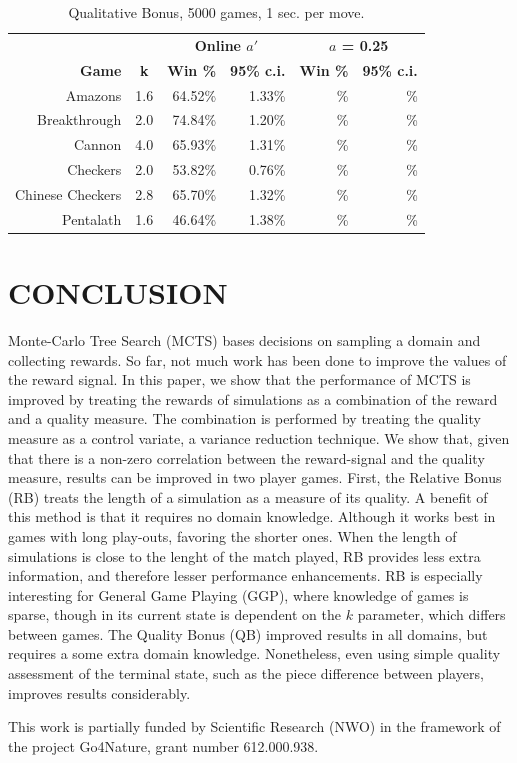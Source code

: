\documentclass{ecai2014}
\begin{document}
\begin{table}
{\caption{Qualitative Bonus, 5000 games, 1 sec. per move.} \label{tab:qb}}
\begin{center}
\begin{tabular}{rlrrrr}
\hline
\rule{0pt}{12pt}
&&\multicolumn{2}{c}{\textbf{Online $a'$}}&\multicolumn{2}{c}{\textbf{$a$ = 0.25}} \\
\cline{3-6}
\rule{0pt}{12pt}
\textbf{Game} & \multicolumn{1}{c|}{\textbf{k}} & \textbf{Win \%} & \textbf{95\% c.i.} &\textbf{Win \%} & \textbf{95\% c.i.}\\
\hline
\rule{0pt}{10pt}
Amazons &\multicolumn{1}{l|}{1.6}			& 64.52\% & 1.33\% & \% & \% \\
Breakthrough &\multicolumn{1}{l|}{2.0} 		& 74.84\% & 1.20\% & \% & \% \\
Cannon &\multicolumn{1}{l|}{4.0} 			& 65.93\% & 1.31\% & \% & \% \\
Checkers &\multicolumn{1}{l|}{2.0}			& 53.82\% & 0.76\% & \% & \% \\
Chinese Checkers &\multicolumn{1}{l|}{2.8} 	& 65.70\% & 1.32\% & \% & \% \\
Pentalath &\multicolumn{1}{l|}{1.6} 		& 46.64\% & 1.38\% & \% & \% \\
\hline
\end{tabular}
\end{center}
\end{table}

\section{CONCLUSION}
Monte-Carlo Tree Search (MCTS) bases decisions on sampling a domain and collecting rewards. So far, not much work has been done to improve the values of the reward signal. In this paper, we show that the performance of MCTS is improved by treating the rewards of simulations as a combination of the reward and a quality measure. The combination is performed by treating the quality measure as a control variate, a variance reduction technique. We show that, given that there is a non-zero correlation between the reward-signal and the quality measure, results can be improved in two player games.
First, the Relative Bonus (RB) treats the length of a simulation as a measure of its quality. A benefit of this method is that it requires no domain knowledge. Although it works best in games with long play-outs, favoring the shorter ones. When the length of simulations is close to the lenght of the match played, RB provides less extra information, and therefore lesser performance enhancements. RB is especially interesting for General Game Playing (GGP), where knowledge of games is sparse, though in its current state is dependent on the $k$ parameter, which differs between games.
The Quality Bonus (QB) improved results in all domains, but requires a some extra domain knowledge. Nonetheless, even using simple quality assessment of the terminal state, such as the piece difference between players, improves results considerably.

\ack This work is partially funded by Scientific Research (NWO) in the framework of the project Go4Nature, grant number 612.000.938.


\end{document}
